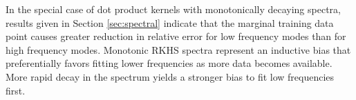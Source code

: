 \documentclass{article}
\newcommand{\cp}[1]{{\color{red} #1}}
\begin{document}
In the special case of dot product kernels with monotonically decaying spectra, results given in Section \ref{sec:spectral} indicate that the marginal training data point causes greater reduction in relative error for low frequency modes than for high frequency modes. Monotonic RKHS spectra represent an inductive bias that preferentially favors fitting lower frequencies as more data becomes available. More rapid decay in the spectrum yields a stronger bias to fit low frequencies first.

%
%

\end{document}
